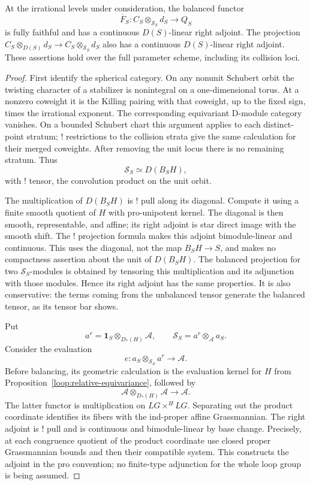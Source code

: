 \begin{proposition}\label{loop:pairing-adjoints}
At the irrational levels under consideration, the balanced functor
\[
               \overline F_S:
               C_S\otimes_{\mathcal S_S}d_S\longrightarrow Q_S
\]
is fully faithful and has a continuous $D(S)$-linear right adjoint.
The projection
$C_S\otimes_{D(S)}d_S\to C_S\otimes_{\mathcal S_S}d_S$
also has a continuous $D(S)$-linear right adjoint.
These assertions hold over the full parameter scheme, including
its collision loci.
\end{proposition}

\begin{proof}
First identify the spherical category.  On any nonunit Schubert
orbit the twisting character of a stabilizer is nonintegral on
a one-dimensional torus.  At a nonzero coweight it is the
Killing pairing with that coweight, up to the fixed sign, times
the irrational exponent.  The corresponding equivariant
D-module category vanishes.  On a bounded Schubert chart this
argument applies to each distinct-point stratum; ! restrictions
to the collision strata give the same calculation for their
merged coweights.  After removing the unit locus there is no
remaining stratum.  Thus
\[
                         \mathcal S_S\simeq D(B_SH),
\]
with ! tensor, the convolution product on the unit orbit.

The multiplication of $D(B_SH)$ is ! pull along its diagonal.
Compute it using a finite smooth quotient of $H$ with
pro-unipotent kernel.  The diagonal is then smooth,
representable, and affine; its right adjoint is star direct
image with the smooth shift.  The ! projection formula makes
this adjoint bimodule-linear and continuous.  This uses the diagonal,
not the map $B_SH\to S$, and makes no compactness assertion about
the unit of $D(B_SH)$.  The balanced
projection for two $\mathcal S_S$-modules is obtained by
tensoring this multiplication and its adjunction with those
modules.  Hence its right adjoint has the same properties.
It is also conservative: the terms coming from the unbalanced
tensor generate the balanced tensor, as its tensor bar shows.

Put
\[
        a^r=\mathbf1_S\otimes_{D_*(H)}\mathcal A,
        \qquad
        \mathcal S_S=a^r\otimes_{\mathcal A}a_S.
\]
Consider the evaluation
\[
             e:a_S\otimes_{\mathcal S_S}a^r\longrightarrow\mathcal A.
\]
Before balancing, its geometric calculation is the evaluation
kernel for $H$ from Proposition~\ref{loop:relative-equivariance},
followed by
\[
             \mathcal A\otimes_{D_*(H)}\mathcal A
                            \longrightarrow\mathcal A.
\]
The latter functor is multiplication on $LG\times^H LG$.
Separating out the product coordinate identifies its fibers
with the ind-proper affine Grassmannian.  The right adjoint is
! pull and is continuous and bimodule-linear by base change.
Precisely, at each congruence quotient of the product coordinate
use closed proper Grassmannian bounds and then their compatible
system.  This constructs the adjoint in the pro convention;
no finite-type adjunction for the whole loop group is being
assumed.


\end{proof}
